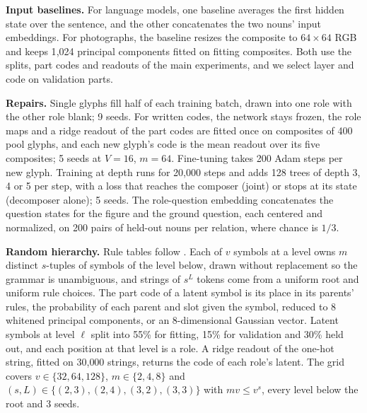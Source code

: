 \documentclass[10pt]{article}
\theoremstyle{plain}
\theoremstyle{remark}
\begin{document}
\textbf{Input baselines.} For language models, one baseline averages the first hidden state over the sentence, and the other concatenates the two nouns' input embeddings. For photographs, the baseline resizes the composite to $64 \times 64$ RGB and keeps 1{,}024 principal components fitted on fitting composites. Both use the splits, part codes and readouts of the main experiments, and we select layer and code on validation parts.

\textbf{Repairs.} Single glyphs fill half of each training batch, drawn into one role with the other role blank; 9 seeds. For written codes, the network stays frozen, the role maps and a ridge readout of the part codes are fitted once on composites of 400 pool glyphs, and each new glyph's code is the mean readout over its five composites; 5 seeds at $V = 16$, $m = 64$. Fine-tuning takes 200 Adam steps per new glyph. Training at depth runs for 20{,}000 steps and adds 128 trees of depth 3, 4 or 5 per step, with a loss that reaches the composer (joint) or stops at its state (decomposer alone); 5 seeds. The role-question embedding concatenates the question states for the figure and the ground question, each centered and normalized, on 200 pairs of held-out nouns per relation, where chance is $1/3$.

\textbf{Random hierarchy.} Rule tables follow \citet{cagnetta2024rhm}. Each of $v$ symbols at a level owns $m$ distinct $s$-tuples of symbols of the level below, drawn without replacement so the grammar is unambiguous, and strings of $s^L$ tokens come from a uniform root and uniform rule choices. The part code of a latent symbol is its place in its parents' rules, the probability of each parent and slot given the symbol, reduced to 8 whitened principal components, or an 8-dimensional Gaussian vector. Latent symbols at level $\ell$ split into 55\% for fitting, 15\% for validation and 30\% held out, and each position at that level is a role. A ridge readout of the one-hot string, fitted on 30{,}000 strings, returns the code of each role's latent. The grid covers $v \in \{32, 64, 128\}$, $m \in \{2, 4, 8\}$ and $(s, L) \in \{(2,3), (2,4), (3,2), (3,3)\}$ with $mv \le v^s$, every level below the root and 3 seeds.
\end{document}
